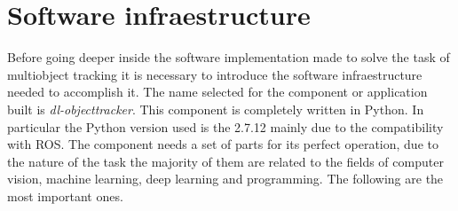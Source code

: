 \chapter{Software infraestructure}
Before going deeper inside the software implementation made to solve the task of multiobject tracking it is necessary to introduce the software infraestructure needed to accomplish it. The name selected for the component or application built is \textit{dl-objecttracker}. This component is completely written in Python. In particular the Python version used is the 2.7.12 mainly due to the compatibility with ROS. The component needs a set of parts for its perfect operation, due to the nature of the task the majority of them are related to the fields of computer vision, machine learning, deep learning and programming. The following are the most important ones.

